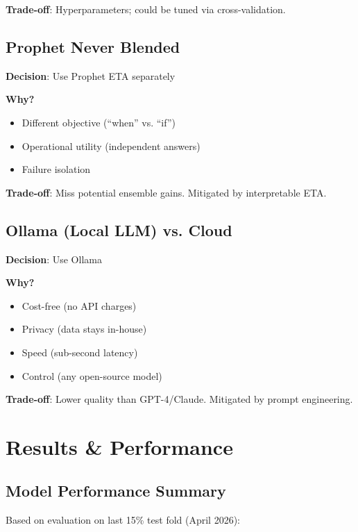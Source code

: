 \documentclass[11pt,a4paper,oneside]{report}
\begin{document}
\textbf{Trade-off}: Hyperparameters; could be tuned via cross-validation.

\section{Prophet Never Blended}

\textbf{Decision}: Use Prophet ETA separately

\textbf{Why?}
\begin{itemize}
    \item Different objective (``when'' vs. ``if'')
    \item Operational utility (independent answers)
    \item Failure isolation
\end{itemize}

\textbf{Trade-off}: Miss potential ensemble gains. Mitigated by interpretable ETA.

\section{Ollama (Local LLM) vs. Cloud}

\textbf{Decision}: Use Ollama

\textbf{Why?}
\begin{itemize}
    \item Cost-free (no API charges)
    \item Privacy (data stays in-house)
    \item Speed (sub-second latency)
    \item Control (any open-source model)
\end{itemize}

\textbf{Trade-off}: Lower quality than GPT-4/Claude. Mitigated by prompt engineering.

\newpage

\chapter{Results \& Performance}

\section{Model Performance Summary}

Based on evaluation on last 15\% test fold (April 2026):
\end{document}
